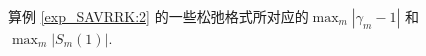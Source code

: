\begin{figure}[H]
\begin{center}
\caption{算例 \ref{exp_SAVRRK:2} 的一些松弛格式所对应的$\max_m\left|\gamma_m-1\right|$ 和 $\max_m\left|S_m(1)\right|$.}
\label{fig_SAVRRK:2-1}
\end{center}
\end{figure}
\vspace{-8mm}
